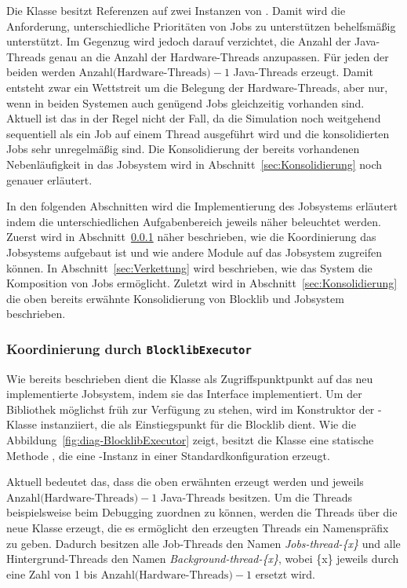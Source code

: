 Die Klasse besitzt Referenzen auf zwei Instanzen von . Damit wird die Anforderung, unterschiedliche Prioritäten von Jobs zu unterstützen behelfsmäßig unterstützt. Im Gegenzug wird jedoch darauf verzichtet, die Anzahl der Java-Threads genau an die Anzahl der Hardware-Threads anzupassen. Für jeden der beiden  werden $\text{Anzahl(Hardware-Threads)} - 1$ Java-Threads erzeugt. Damit entsteht zwar ein Wettstreit um die Belegung der Hardware-Threads, aber nur, wenn in beiden Systemen auch genügend Jobs gleichzeitig vorhanden sind. Aktuell ist das in der Regel nicht der Fall, da die Simulation noch weitgehend sequentiell als ein Job auf einem Thread ausgeführt wird und die konsolidierten Jobs sehr unregelmäßig sind. Die Konsolidierung der bereits vorhandenen Nebenläufigkeit in das Jobsystem wird in Abschnitt~\ref{sec:Konsolidierung} noch genauer erläutert. 

In den folgenden Abschnitten wird die Implementierung des Jobsystems erläutert indem die unterschiedlichen Aufgabenbereich jeweils näher beleuchtet werden. Zuerst wird in Abschnitt~\ref{sec:Koordinierung} näher beschrieben, wie die Koordinierung das Jobsystems aufgebaut ist und wie andere Module auf das Jobsystem zugreifen können. In Abschnitt~\ref{sec:Verkettung} wird beschrieben, wie das System die Komposition von Jobs ermöglicht. Zuletzt wird in Abschnitt~\ref{sec:Konsolidierung} die oben bereits erwähnte Konsolidierung von Blocklib und Jobsystem beschrieben.

\subsubsection{Koordinierung durch \texttt{BlocklibExecutor}}\label{sec:Koordinierung}

Wie bereits beschrieben dient die Klasse  als Zugriffspunktpunkt auf das neu implementierte Jobsystem, indem sie das Interface  implementiert. Um der Bibliothek möglichst früh zur Verfügung zu stehen, wird  im Konstruktor der -Klasse instanziiert, die als Einstiegspunkt für die Blocklib dient. Wie die Abbildung~\ref{fig:diag-BlocklibExecutor} zeigt, besitzt die Klasse  eine statische Methode , die eine -Instanz in einer Standardkonfiguration erzeugt.

Aktuell bedeutet das, dass die oben erwähnten  erzeugt werden und jeweils $\text{Anzahl(Hardware-Threads)} - 1$ Java-Threads besitzen. Um die Threads beispielsweise beim Debugging zuordnen zu können, werden die Threads über die neue Klasse  erzeugt, die es ermöglicht den erzeugten Threads ein Namenspräfix zu geben. Dadurch besitzen alle Job-Threads den Namen \emph{Jobs-thread-\{x\}} und alle Hintergrund-Threads den Namen \emph{Background-thread-\{x\}}, wobei \{x\} jeweils durch eine Zahl von 1 bis $\text{Anzahl(Hardware-Threads)} - 1$ ersetzt wird.

